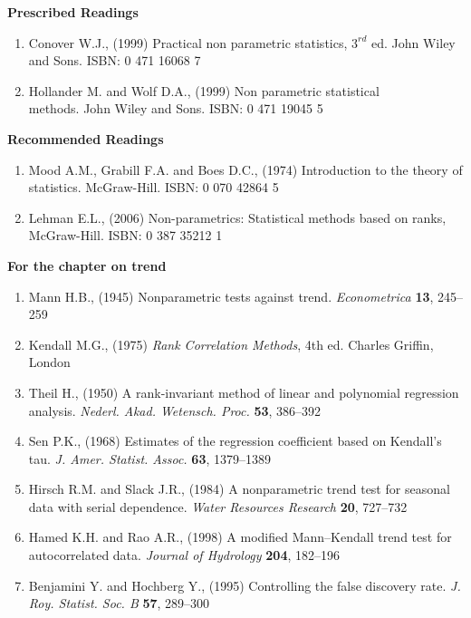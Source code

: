 \documentclass[11pt,a4paper]{article}
\theoremstyle{definition}
\begin{document}
\pagebreak
\textbf{Prescribed Readings}
\begin{enumerate}
\item Conover W.J., (1999) Practical non parametric statistics, $3^{rd}$ ed. John Wiley and Sons. ISBN: 0 471 16068 7
\item Hollander M. and Wolf D.A., (1999) Non parametric statistical\\ methods. John Wiley and Sons. ISBN: 0 471 19045 5\\
\end{enumerate}
\textbf{Recommended Readings}
\begin{enumerate}
\item Mood A.M., Grabill F.A. and Boes D.C., (1974) Introduction to the theory of statistics. McGraw-Hill. ISBN: 0 070 42864 5
\item Lehman E.L., (2006) Non-parametrics: Statistical methods based on ranks, McGraw-Hill. ISBN: 0 387 35212 1
\end{enumerate}
\textbf{For the chapter on trend}
\begin{enumerate}
\item Mann H.B., (1945) Nonparametric tests against trend. \textit{Econometrica} \textbf{13}, 245--259
\item Kendall M.G., (1975) \textit{Rank Correlation Methods}, 4th ed. Charles Griffin, London
\item Theil H., (1950) A rank-invariant method of linear and polynomial regression analysis. \textit{Nederl. Akad. Wetensch. Proc.} \textbf{53}, 386--392
\item Sen P.K., (1968) Estimates of the regression coefficient based on Kendall's tau. \textit{J. Amer. Statist. Assoc.} \textbf{63}, 1379--1389
\item Hirsch R.M. and Slack J.R., (1984) A nonparametric trend test for seasonal data with serial dependence. \textit{Water Resources Research} \textbf{20}, 727--732
\item Hamed K.H. and Rao A.R., (1998) A modified Mann--Kendall trend test for autocorrelated data. \textit{Journal of Hydrology} \textbf{204}, 182--196
\item Benjamini Y. and Hochberg Y., (1995) Controlling the false discovery rate. \textit{J. Roy. Statist. Soc. B} \textbf{57}, 289--300
\end{enumerate}
\end{document}
